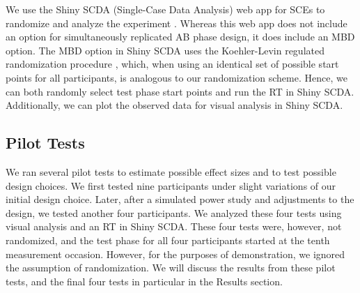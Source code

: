 \documentclass[empirical,issue, twocolumn,authordate]{jote-new-article}
\begin{document}
We use the Shiny SCDA (Single-Case Data Analysis) web app for SCEs to randomize and analyze the experiment \parencite{De2020a}. Whereas this web app does not include an option for simultaneously replicated AB phase design, it does include an MBD option. The MBD option in Shiny SCDA uses the Koehler-Levin regulated randomization procedure \parencite{Levin2018}, which, when using an identical set of possible start points for all participants, is analogous to our randomization scheme. Hence, we can both randomly select test phase start points and run the RT in Shiny SCDA. Additionally, we can plot the observed data for visual analysis in Shiny SCDA. 

\subsection{Pilot Tests}

We ran several pilot tests to estimate possible effect sizes and to test possible design choices. We first tested nine participants under slight variations of our initial design choice. Later, after a simulated power study and adjustments to the design, we tested another four participants. We analyzed these four tests using visual analysis and an RT in Shiny SCDA. These four tests were, however, not randomized, and the test phase for all four participants started at the tenth measurement occasion. However, for the purposes of demonstration, we ignored the assumption of randomization. We will discuss the results from these pilot tests, and the final four tests in particular in the Results section. 
\end{document}
